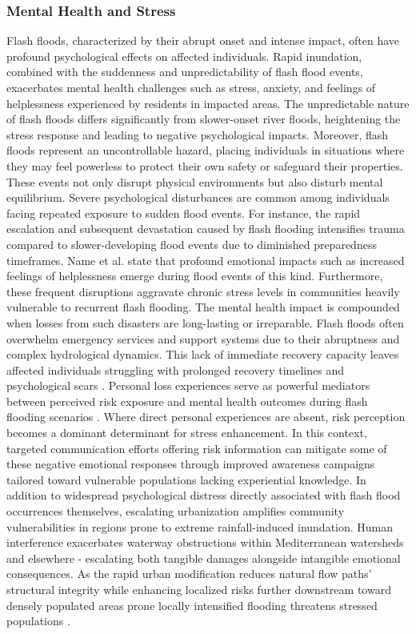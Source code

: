 \subsubsection{Mental Health and Stress}
Flash floods, characterized by their abrupt onset and intense impact, often have profound psychological effects on affected individuals. Rapid inundation, combined with the suddenness and unpredictability of flash flood events, exacerbates mental health challenges such as stress, anxiety, and feelings of helplessness experienced by residents in impacted areas. The unpredictable nature of flash floods differs significantly from slower-onset river floods, heightening the stress response and leading to negative psychological impacts. Moreover, flash floods represent an uncontrollable hazard, placing individuals in situations where they may feel powerless to protect their own safety or safeguard their properties. These events not only disrupt physical environments but also disturb mental equilibrium.
Severe psychological disturbances are common among individuals facing repeated exposure to sudden flood events. For instance, the rapid escalation and subsequent devastation caused by flash flooding intensifies trauma compared to slower-developing flood events due to diminished preparedness timeframes. Name et al. state that profound emotional impacts such as increased feelings of helplessness emerge during flood events of this kind. Furthermore, these frequent disruptions aggravate chronic stress levels in communities heavily vulnerable to recurrent flash flooding.
The mental health impact is compounded when losses from such disasters are long-lasting or irreparable. Flash floods often overwhelm emergency services and support systems due to their abruptness and complex hydrological dynamics. This lack of immediate recovery capacity leaves affected individuals struggling with prolonged recovery timelines and psychological scars \citep{Laudan2020}.
Personal loss experiences serve as powerful mediators between perceived risk exposure and mental health outcomes during flash flooding scenarios \citep{Zhang2024}. Where direct personal experiences are absent, risk perception becomes a dominant determinant for stress enhancement. In this context, targeted communication efforts offering risk information can mitigate some of these negative emotional responses through improved awareness campaigns tailored toward vulnerable populations lacking experiential knowledge.
In addition to widespread psychological distress directly associated with flash flood occurrences themselves, escalating urbanization amplifies community vulnerabilities in regions prone to extreme rainfall-induced inundation. Human interference exacerbates waterway obstructions within Mediterranean watersheds and elsewhere - escalating both tangible damages alongside intangible emotional consequences. As the rapid urban modification reduces natural flow paths' structural integrity while enhancing localized risks further downstream toward densely populated areas prone locally intensified flooding threatens stressed populations \citep{Kastridis2020}\citep{Amponsah2018}.
